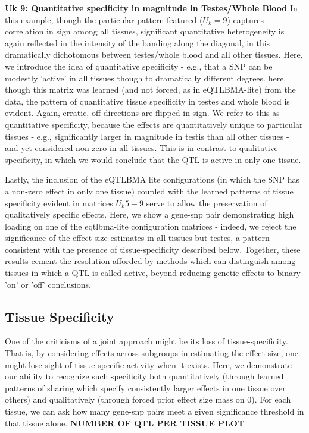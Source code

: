 \textbf{Uk 9: Quantitative specificity in magnitude in Testes/Whole Blood}
In this example, though the particular pattern featured ($U_{k}=9$) captures correlation in sign among all tissues, significant quantitative heterogeneity is again reflected in the intensity of the banding along the diagonal, in this dramatically dichotomous between testes/whole blood and all other tissues. Here, we introduce the idea of quantitative specificity - e.g., that a SNP can be modestly 'active' in all tissues though to dramatically different degrees. here, though this matrix was learned (and not forced, as in eQTLBMA-lite) from the data, the pattern of quantitative tissue specificity in testes and whole blood is evident. Again, erratic, off-directions are flipped in sign. We refer to this as quantitative specificity, because the effects are quantitatively unique to particular tissues - e.g., significantly larger in magnitude in testis than all other tissues - and yet considered non-zero in all tissues. This is in contrast to qualitative specificity, in which we would conclude that the QTL is active in only one tissue. 

Lastly, the inclusion of the eQTLBMA lite configurations (in which the SNP has a non-zero effect in only one tissue) coupled with the learned patterns of tissue specificity evident in matrices $U_{k}5-9$ serve to allow the preservation of qualitatively specific effects. Here, we show a gene-snp pair demonstrating high loading on one of the eqtlbma-lite configuration matrices - indeed, we reject the significance of the effect size estimates in all tissues but testes, a pattern consistent with the presence of tissue-specificity described below. Together, these results cement the resolution afforded by methods which can distinguish among tissues in which a QTL is called active, beyond reducing genetic effects to binary 'on' or 'off' conclusions.


\subsection{Tissue Specificity}

One of the criticisms of a joint approach might be its loss of tissue-specificity. That is, by considering effects across subgroups in estimating the effect size, one might lose sight of tissue specific activity when it exists. Here, we demonstrate our ability to recognize such specificity both quantitatively (through learned patterns of sharing which specify consistently larger effects in one tissue over others) and qualitatively (through forced prior effect size mass on 0).  For each tissue, we can ask how many gene-snp pairs meet a given significance threshold in that tissue alone. 
\textbf{NUMBER OF QTL PER TISSUE PLOT}

